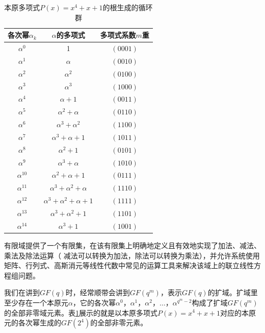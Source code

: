 \begin{table}[htbp]
	\centering
	\caption{本原多项式$P\left(x\right)=x^{4}+x+1$的根生成的循环群}
	\begin{tabularx}{250pt}{c|c|c}
		\toprule
		\textbf{各次幂$\alpha_{k}$} & \textbf{$\alpha$的多项式}&\textbf{多项式系数$m$重}\\
		\midrule
		$\alpha^{0}$ & 1 &$\left(0001\right)$\\
		\hline
		$\alpha^{1}$ & $\alpha$ &$\left(0010\right)$\\
		\hline
		$\alpha^{2}$ & $\alpha^{2}$ & $\left(0100\right)$\\
		\hline
		$\alpha^{3}$ & $\alpha^{3}$ & $\left(1000\right)$\\
		\hline
		$\alpha^{4}$ & $\alpha+1$ & $\left(0011\right)$\\
		\hline
		$\alpha^{5}$ & $\alpha^{2}+\alpha$ & $\left(0110\right)$\\
		\hline
		$\alpha^{6}$ & $\alpha^{3}+\alpha^{2}$ & $\left(1100\right)$\\
		\hline
		$\alpha^{7}$ & $\alpha^{3}+\alpha+1$ & $\left(1011\right)$\\
		\hline
		$\alpha^{8}$ & $\alpha^{2}+1$ & $\left(0101\right)$\\
		\hline
		$\alpha^{9}$ & $\alpha^{3}+\alpha$ & $\left(1010\right)$\\
		\hline
		$\alpha^{10}$ & $\alpha^{2}+\alpha+1$ & $\left(0111\right)$\\
		\hline
		$\alpha^{11}$ & $\alpha^{3}+\alpha^{2}+\alpha$ & $\left(1110\right)$\\
		\hline
		$\alpha^{12}$ & $\alpha^{3}+\alpha^{2}+\alpha+1$ & $\left(1111\right)$\\
		\hline
		$\alpha^{13}$ & $\alpha^{3}+\alpha^{2}+1$ & $\left(1101\right)$\\
		\hline
		$\alpha^{14}$ & $\alpha^{3}+1$ & $\left(1001\right)$\\
		\hline
	\end{tabularx}
	\label{SHUYU}
\end{table}
\par
有限域提供了一个有限集，在该有限集上明确地定义且有效地实现了加法、减法、乘法及除法运算（ 减法可以转换为加法，除法可以转换为乘法），并允许系统使用矩阵、行列式、高斯消元等线性代数中常见的运算工具来解决该域上的联立线性方程组问题。
\par
我们在讲到$GF\left(q\right)$时，经常顺带会讲到$GF\left(q^{m}\right)$，表示$GF\left(q\right)$的扩域。扩域里至少存在一个本原元$\alpha$，它的各次幂$\alpha^{0}$，$\alpha^{1}$，$\alpha^{2}$，$\dots$，$\alpha^{q^{m}-2}$构成了扩域$GF\left(q^{m}\right)$的全部非零域元素。表\ref{SHUYU}展示的就是以本原多项式$P\left(x\right)=x^{4}+x+1$对应的本原元的各次幂生成的$GF\left(2^4\right)$的全部非零元素。
